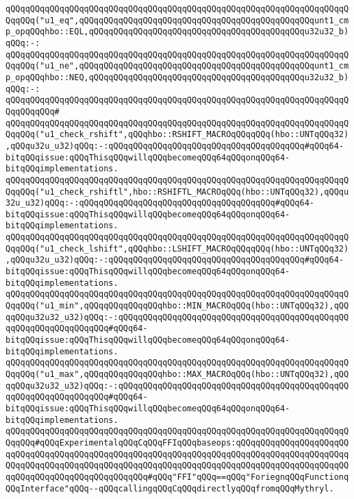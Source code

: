 \verb|qQQqqQQqqQQqqQQqqQQqqQQqqQQqqQQqqQQqqQQqqQQqqQQqqQQqqQQqqQQqqQQqqQQqqQQqqQQq("u1_eq",qQQqqQQqqQQqqQQqqQQqqQQqqQQqqQQqqQQqqQQqqQQqqQQqunt1_cmp_opqQQqhbo::EQL,qQQqqQQqqQQqqQQqqQQqqQQqqQQqqQQqqQQqqQQqqQQqu32u32_b)qQQq:-:|\newline
\verb|qQQqqQQqqQQqqQQqqQQqqQQqqQQqqQQqqQQqqQQqqQQqqQQqqQQqqQQqqQQqqQQqqQQqqQQqqQQq("u1_ne",qQQqqQQqqQQqqQQqqQQqqQQqqQQqqQQqqQQqqQQqqQQqqQQqunt1_cmp_opqQQqhbo::NEQ,qQQqqQQqqQQqqQQqqQQqqQQqqQQqqQQqqQQqqQQqqQQqu32u32_b)qQQq:-:|\newline
\verb|qQQqqQQqqQQqqQQqqQQqqQQqqQQqqQQqqQQqqQQqqQQqqQQqqQQqqQQqqQQqqQQqqQQqqQQqqQQqqQQq#|\newline
\verb|qQQqqQQqqQQqqQQqqQQqqQQqqQQqqQQqqQQqqQQqqQQqqQQqqQQqqQQqqQQqqQQqqQQqqQQqqQQq("u1_check_rshift",qQQqhbo::RSHIFT_MACROqQQqqQQq(hbo::UNTqQQq32),qQQqu32u_u32)qQQq:-:qQQqqQQqqQQqqQQqqQQqqQQqqQQqqQQqqQQqqQQq#qQQq64-bitqQQqissue:qQQqThisqQQqwillqQQqbecomeqQQq64qQQqonqQQq64-bitqQQqimplementations.|\newline
\verb|qQQqqQQqqQQqqQQqqQQqqQQqqQQqqQQqqQQqqQQqqQQqqQQqqQQqqQQqqQQqqQQqqQQqqQQqqQQq("u1_check_rshiftl",hbo::RSHIFTL_MACROqQQq(hbo::UNTqQQq32),qQQqu32u_u32)qQQq:-:qQQqqQQqqQQqqQQqqQQqqQQqqQQqqQQqqQQqqQQq#qQQq64-bitqQQqissue:qQQqThisqQQqwillqQQqbecomeqQQq64qQQqonqQQq64-bitqQQqimplementations.|\newline
\verb|qQQqqQQqqQQqqQQqqQQqqQQqqQQqqQQqqQQqqQQqqQQqqQQqqQQqqQQqqQQqqQQqqQQqqQQqqQQq("u1_check_lshift",qQQqhbo::LSHIFT_MACROqQQqqQQq(hbo::UNTqQQq32),qQQqu32u_u32)qQQq:-:qQQqqQQqqQQqqQQqqQQqqQQqqQQqqQQqqQQqqQQq#qQQq64-bitqQQqissue:qQQqThisqQQqwillqQQqbecomeqQQq64qQQqonqQQq64-bitqQQqimplementations.|\newline
\newline
\verb|qQQqqQQqqQQqqQQqqQQqqQQqqQQqqQQqqQQqqQQqqQQqqQQqqQQqqQQqqQQqqQQqqQQqqQQqqQQq("u1_min",qQQqqQQqqQQqqQQqhbo::MIN_MACROqQQq(hbo::UNTqQQq32),qQQqqQQqu32u32_u32)qQQq:-:qQQqqQQqqQQqqQQqqQQqqQQqqQQqqQQqqQQqqQQqqQQqqQQqqQQqqQQqqQQqqQQqqQQq#qQQq64-bitqQQqissue:qQQqThisqQQqwillqQQqbecomeqQQq64qQQqonqQQq64-bitqQQqimplementations.|\newline
\verb|qQQqqQQqqQQqqQQqqQQqqQQqqQQqqQQqqQQqqQQqqQQqqQQqqQQqqQQqqQQqqQQqqQQqqQQqqQQq("u1_max",qQQqqQQqqQQqqQQqhbo::MAX_MACROqQQq(hbo::UNTqQQq32),qQQqqQQqu32u32_u32)qQQq:-:qQQqqQQqqQQqqQQqqQQqqQQqqQQqqQQqqQQqqQQqqQQqqQQqqQQqqQQqqQQqqQQqqQQq#qQQq64-bitqQQqissue:qQQqThisqQQqwillqQQqbecomeqQQq64qQQqonqQQq64-bitqQQqimplementations.|\newline
\newline
\verb|qQQqqQQqqQQqqQQqqQQqqQQqqQQqqQQqqQQqqQQqqQQqqQQqqQQqqQQqqQQqqQQqqQQqqQQqqQQq#qQQqExperimentalqQQqCqQQqFFIqQQqbaseops:qQQqqQQqqQQqqQQqqQQqqQQqqQQqqQQqqQQqqQQqqQQqqQQqqQQqqQQqqQQqqQQqqQQqqQQqqQQqqQQqqQQqqQQqqQQqqQQqqQQqqQQqqQQqqQQqqQQqqQQqqQQqqQQqqQQqqQQqqQQqqQQqqQQqqQQqqQQqqQQqqQQqqQQqqQQqqQQqqQQqqQQqqQQqqQQq#qQQq"FFI"qQQq==qQQq"ForiegnqQQqFunctionqQQqInterface"qQQq--qQQqcallingqQQqCqQQqdirectlyqQQqfromqQQqMythryl.|\newline
